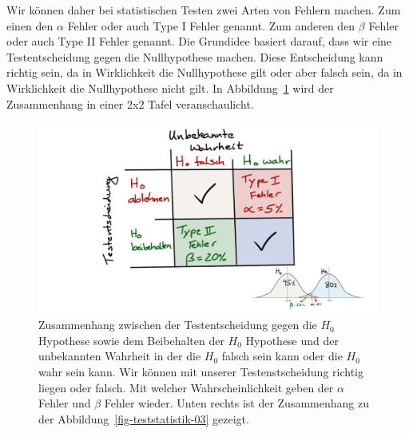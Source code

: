 \documentclass[
  letterpaper,
]{scrbook}
\begin{document}
{}

Wir können daher bei statistischen Testen zwei Arten von Fehlern machen.
Zum einen den \(\alpha\) Fehler oder auch Type I Fehler genannt. Zum
anderen den \(\beta\) Fehler oder auch Type II Fehler genannt. Die
Grundidee basiert darauf, dass wir eine Testentscheidung gegen die
Nullhypothese machen. Diese Entscheidung kann richtig sein, da in
Wirklichkeit die Nullhypothese gilt oder aber falsch sein, da in
Wirklichkeit die Nullhypothese nicht gilt. In
Abbildung~\ref{fig-teststatistik-04} wird der Zusammenhang in einer 2x2
Tafel veranschaulicht.

\begin{figure}

{\centering \includegraphics{./images/t-verteilung_04.png}

}

\caption{\label{fig-teststatistik-04}Zusammenhang zwischen der
Testentscheidung gegen die \(H_0\) Hypothese sowie dem Beibehalten der
\(H_0\) Hypothese und der unbekannten Wahrheit in der die \(H_0\) falsch
sein kann oder die \(H_0\) wahr sein kann. Wir können mit unserer
Testenstscheidung richtig liegen oder falsch. Mit welcher
Wahrscheinlichkeit geben der \(\alpha\) Fehler und \(\beta\) Fehler
wieder. Unten rechts ist der Zusammenhang zu der
Abbildung~\ref{fig-teststatistik-03} gezeigt.}

\end{figure}
\end{document}
